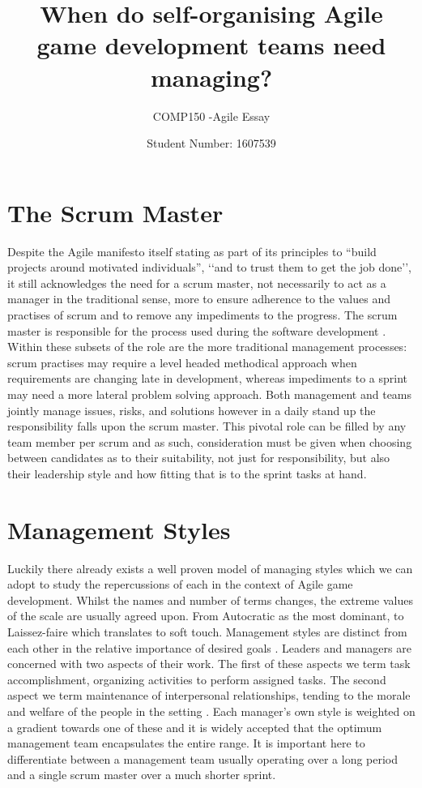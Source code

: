 \documentclass{scrartcl}
\title{When do self-organising Agile game development teams need managing?}
\subtitle{COMP150 -Agile Essay}
\author{Student Number: 1607539}
\begin{document}
\maketitle

\section*{The Scrum Master}

Despite the Agile manifesto \cite {fowler2001agile} itself stating as part of its principles to ``build projects around motivated individuals'', ‘`and to trust them to get the job done'', it still acknowledges the need for a scrum master, not necessarily to act as a manager in the traditional sense, more to ensure adherence to the values and practises of scrum and to remove any impediments to the progress.  The scrum master is responsible for the process used during the software development \cite {larusdottir2016stakeholder}.  Within these subsets of the role are the more traditional management processes: scrum practises may require a level headed methodical approach when requirements are changing late in development, whereas impediments to a sprint may need a more lateral problem solving approach.  Both management and teams jointly manage issues, risks, and solutions \cite {schwaber1997scrum} however in a daily stand up the responsibility falls upon the scrum master.  This pivotal role can be filled by any team member per scrum and as such, consideration must be given when choosing between candidates as to their suitability, not just for responsibility, but also their leadership style and how fitting that is to the sprint tasks at hand.

\section*{Management Styles}

Luckily there already exists a well proven model of managing styles which we can adopt to study the repercussions of each in the context of Agile game development.  Whilst the names and number of terms changes, the extreme values of the scale are usually agreed upon.  From Autocratic as the most dominant, to Laissez-faire which translates to soft touch.  Management styles are distinct from each other in the relative importance of desired goals \cite{fairweather1994goals}.  Leaders and managers are concerned with two aspects of their work.  The first of these aspects we term task accomplishment, organizing activities to perform assigned tasks.  The second aspect we term maintenance of interpersonal relationships, tending to the morale and welfare of the people in the setting \cite {eagly1990gender}.  Each manager's own style is weighted on a gradient towards one of these and it is widely accepted that the optimum management team encapsulates the entire range.  It is important here to differentiate between a management team usually operating over a long period and a single scrum master over a much shorter sprint. 
\end{document}

